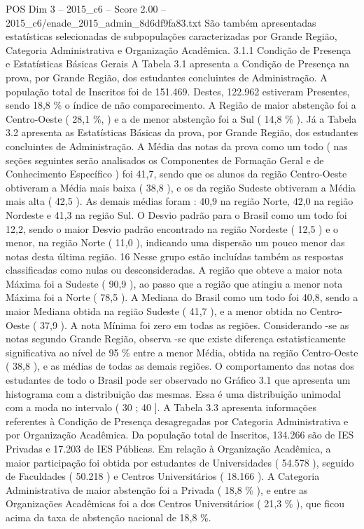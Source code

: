 \begin{textsample}{POS Dim 3 – 2015\_c6 – Score 2.00 – 2015\_c6/enade\_2015\_admin\_8d6df9fa83.txt}
São também apresentadas estatísticas selecionadas de subpopulações caracterizadas por Grande Região, Categoria Administrativa e Organização Acadêmica. 3.1.1 Condição de Presença e Estatísticas Básicas Gerais A Tabela 3.1 apresenta a Condição de Presença na prova, por Grande Região, dos estudantes concluintes de Administração.
A população total de Inscritos foi de 151.469.
Destes, 122.962 estiveram Presentes, sendo 18,8 \% o índice de não comparecimento.
A Região de maior abstenção foi a Centro-Oeste ( 28,1 \%, ) e a de menor abstenção foi a Sul ( 14,8 \% ).
Já a Tabela 3.2 apresenta as Estatísticas Básicas da prova, por Grande Região, dos estudantes concluintes de Administração.
A Média das notas da prova como um todo ( nas seções seguintes serão analisados os Componentes de Formação Geral e de Conhecimento Específico ) foi 41,7, sendo que os alunos da região Centro-Oeste obtiveram a Média mais baixa ( 38,8 ), e os da região Sudeste obtiveram a Média mais alta ( 42,5 ).
As demais médias foram : 40,9 na região Norte, 42,0 na região Nordeste e 41,3 na região Sul.
O Desvio padrão para o Brasil como um todo foi 12,2, sendo o maior Desvio padrão encontrado na região Nordeste ( 12,5 ) e o menor, na região Norte ( 11,0 ), indicando uma dispersão um pouco menor das notas desta última região. 16 Nesse grupo estão incluídas também as respostas classificadas como nulas ou desconsideradas.
A região que obteve a maior nota Máxima foi a Sudeste ( 90,9 ), ao passo que a região que atingiu a menor nota Máxima foi a Norte ( 78,5 ).
A Mediana do Brasil como um todo foi 40,8, sendo a maior Mediana obtida na região Sudeste ( 41,7 ), e a menor obtida no Centro-Oeste ( 37,9 ).
A nota Mínima foi zero em todas as regiões.
Considerando -se as notas segundo Grande Região, observa -se que existe diferença estatisticamente significativa ao nível de 95 \% entre a menor Média, obtida na região Centro-Oeste ( 38,8 ), e as médias de todas as demais regiões.
O comportamento das notas dos estudantes de todo o Brasil pode ser observado no Gráfico 3.1 que apresenta um histograma com a distribuição das mesmas.
Essa é uma distribuição unimodal com a moda no intervalo ( 30 ; 40 ].
A Tabela 3.3 apresenta informações referentes à Condição de Presença desagregadas por Categoria Administrativa e por Organização Acadêmica.
Da população total de Inscritos, 134.266 são de IES Privadas e 17.203 de IES Públicas.
Em relação à Organização Acadêmica, a maior participação foi obtida por estudantes de Universidades ( 54.578 ), seguido de Faculdades ( 50.218 ) e Centros Universitários ( 18.166 ).
A Categoria Administrativa de maior abstenção foi a Privada ( 18,8 \% ), e entre as Organizações Acadêmicas foi a dos Centros Universitários ( 21,3 \% ), que ficou acima da taxa de abstenção nacional de 18,8 \%.

\end{textsample}
